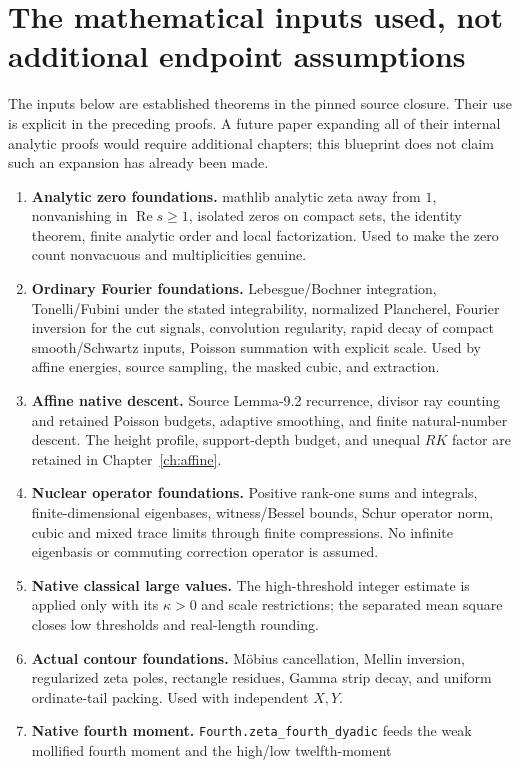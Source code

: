 \documentclass[11pt,a4paper,oneside]{book}
\theoremstyle{definition}
\newcommand{\Rea}{\operatorname{Re}}
\newcommand{\lean}[1]{\nolinkurl{#1}}
\begin{document}
\section{The mathematical inputs used, not additional endpoint assumptions}
The inputs below are established theorems in the pinned source closure.
Their use is explicit in the preceding proofs. A future paper expanding
all of their internal analytic proofs would require additional chapters;
this blueprint does not claim such an expansion has already been made.
\begin{enumerate}[leftmargin=*]
\item \textbf{Analytic zero foundations.} mathlib analytic zeta away from $1$,
nonvanishing in $\Rea s\ge1$, isolated zeros on compact sets, the identity
theorem, finite analytic order and local factorization. Used to make the
zero count nonvacuous and multiplicities genuine.
\item \textbf{Ordinary Fourier foundations.} Lebesgue/Bochner integration,
Tonelli/Fubini under the stated integrability, normalized Plancherel,
Fourier inversion for the cut signals, convolution regularity, rapid decay
of compact smooth/Schwartz inputs, Poisson summation with explicit scale.
Used by affine energies, source sampling, the masked cubic, and extraction.
\item \textbf{Affine native descent.} Source Lemma-9.2 recurrence, divisor
ray counting and retained Poisson budgets, adaptive smoothing, and finite
natural-number descent. The height profile, support-depth budget, and
unequal $RK$ factor are retained in Chapter~\ref{ch:affine}.
\item \textbf{Nuclear operator foundations.} Positive rank-one sums and
integrals, finite-dimensional eigenbases, witness/Bessel bounds, Schur
operator norm, cubic and mixed trace limits through finite compressions.
No infinite eigenbasis or commuting correction operator is assumed.
\item \textbf{Native classical large values.} The high-threshold integer
estimate is applied only with its $\kappa>0$ and scale restrictions; the
separated mean square closes low thresholds and real-length rounding.
\item \textbf{Actual contour foundations.} M\"obius cancellation, Mellin
inversion, regularized zeta poles, rectangle residues, Gamma strip decay,
and uniform ordinate-tail packing. Used with independent $X,Y$.
\item \textbf{Native fourth moment.} \lean{Fourth.zeta_fourth_dyadic}
feeds the weak mollified fourth moment and the high/low twelfth-moment

\end{enumerate}
\end{document}
